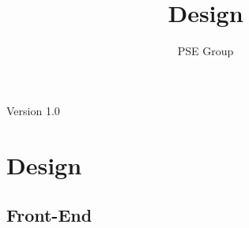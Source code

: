 \documentclass[oneside, english, final]{design}
\author{PSE Group}
\title{
Design}
\begin{document}
\nocite{*}

\setpdf

\maketitle


\hfill

\begin{center}
        \large{Version 1.0}
\end{center}


\thispagestyle{empty}
\begin{abstract}
	\thispagestyle{empty}
\end{abstract}

\thispagestyle{empty}
\newpage
\thispagestyle{empty}
\tableofcontents
\cleardoublepage
\setcounter{page}{1}


\section{Design}\label{sec:intro}
\subsection{Front-End}
\end{document}
